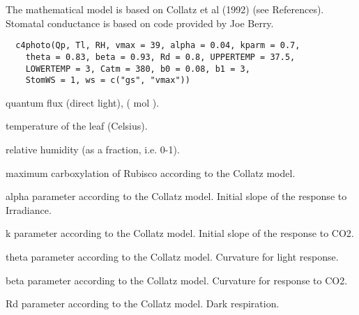 \documentclass[letterpaper]{book}
\begin{document}
%
\begin{Description}\relax
The mathematical model is based on Collatz et al (1992)
(see References). Stomatal conductance is based on code
provided by Joe Berry.
\end{Description}
%
\begin{Usage}
\begin{verbatim}
  c4photo(Qp, Tl, RH, vmax = 39, alpha = 0.04, kparm = 0.7,
    theta = 0.83, beta = 0.93, Rd = 0.8, UPPERTEMP = 37.5,
    LOWERTEMP = 3, Catm = 380, b0 = 0.08, b1 = 3,
    StomWS = 1, ws = c("gs", "vmax"))
\end{verbatim}
\end{Usage}
%
\begin{Arguments}
\begin{ldescription}
\item[\code{Qp}] quantum flux (direct light), (\eqn{\mu}{}
mol  ).

\item[\code{Tl}] temperature of the leaf (Celsius).

\item[\code{RH}] relative humidity (as a fraction, i.e. 0-1).

\item[\code{vmax}] maximum carboxylation of Rubisco according to
the Collatz model.

\item[\code{alpha}] alpha parameter according to the Collatz
model. Initial slope of the response to Irradiance.

\item[\code{kparm}] k parameter according to the Collatz model.
Initial slope of the response to CO2.

\item[\code{theta}] theta parameter according to the Collatz
model. Curvature for light response.

\item[\code{beta}] beta parameter according to the Collatz
model. Curvature for response to CO2.

\item[\code{Rd}] Rd parameter according to the Collatz model.
Dark respiration.

\item[\code{UPPERTEMP}] 

\item[\code{LOWERTEMP}] 


\end{ldescription}
\end{Arguments}
\end{document}
